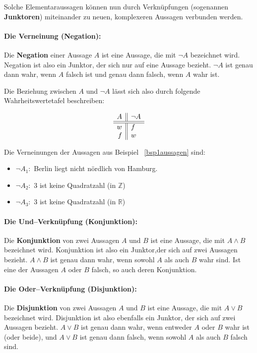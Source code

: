 Solche Elementaraussagen können nun durch Verknüpfungen (sogenannen \textbf{Junktoren}) 
miteinander zu neuen, komplexeren Aussagen verbunden werden. 

\paragraph{Die Verneinung (Negation): \newline }
Die \textbf{Negation} einer Aussage $A$ ist eine Aussage, die mit $\neg A$ bezeichnet wird. Negation ist also ein Junktor, 
der sich nur auf eine Aussage bezieht. $\neg A$ ist genau dann wahr, wenn $A$ falsch ist und genau dann falsch, 
wenn $A$ wahr ist.


Die Beziehung zwischen $A$ und $\neg A$ lässt sich also durch folgende Wahrheitswertetafel beschreiben:

	$$ \begin{array}{ r | | l }
	A &  \neg A \\
	\hline \hline
	w &  f \\
	f &  w \\
	\end{array} $$

\begin{beispiel}\label{bsp2aussagen} Die Verneinungen der Aussagen aus Beispiel ~\ref{bsp1aussagen} sind:
\begin{itemize}
\item $\neg A_1:$ Berlin liegt nicht nördlich von Hamburg.
\item $\neg A_2:$ 3 ist keine Quadratzahl (in $\mathbb Z$)
\item $\neg A_3:$ 3 ist keine Quadratzahl (in $\mathbb R$)
\end{itemize}
\end{beispiel}

\paragraph{Die Und--Verknüpfung (Konjunktion): \newline }
Die \textbf{Konjunktion} von zwei Aussagen $A$ und $B$ ist eine Aussage, die mit $A \wedge B$ bezeichnet 
wird. Konjunktion ist also ein Junktor,der sich auf zwei Aussagen bezieht. $A \wedge B$ ist genau dann wahr, wenn 
sowohl $A$ als auch $B$ wahr sind. Ist eine der Aussagen $A$ oder $B$ falsch, so auch deren Konjunktion.

\paragraph{Die Oder--Verknüpfung (Disjunktion): \newline } 
Die \textbf{Disjunktion} von zwei Aussagen $A$ und $B$ ist eine Aussage, die  mit $A \vee B$ bezeichnet wird. Disjunktion 
ist also ebenfalls ein Junktor, der sich auf zwei Aussagen bezieht. $A \vee B$ ist genau dann wahr, wenn entweder 
$A$ oder $B$ wahr ist (oder beide), und $A \vee B$ ist genau dann falsch, wenn sowohl $A$ als auch $B$ falsch sind.

